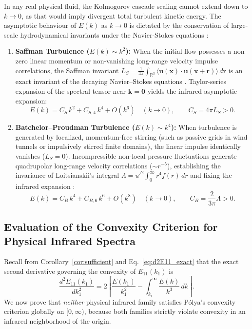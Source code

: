 \documentclass[lineno]{jfm}
\begin{document}
In any real physical fluid, the Kolmogorov cascade scaling cannot extend down to $k \to 0$, as that would imply divergent total turbulent kinetic energy. The asymptotic behaviour of $E(k)$ as $k \to 0$ is dictated by the conservation of large-scale hydrodynamical invariants under the Navier-Stokes equations \citep{BatchelorProudman1956, Saffman1967, Davidson2004}:
\begin{enumerate}
\item \textbf{Saffman Turbulence ($E(k) \sim k^2$):} When the initial flow possesses a non-zero linear momentum or non-vanishing long-range velocity impulse correlations, the Saffman invariant $L_S = \frac{1}{4\pi} \int_{\mathbb{R}^3} \langle \mathbf{u}(\mathbf{x}) \cdot \mathbf{u}(\mathbf{x}+\mathbf{r}) \rangle\,d\mathbf{r}$ is an exact invariant of the decaying Navier--Stokes equations \citep{Saffman1967, Davidson2004}. Taylor-series expansion of the spectral tensor near $\mathbf{k} = \mathbf{0}$ yields the infrared asymptotic expansion:
\begin{equation}
E(k) = C_S\,k^2 + C_{S,4}\,k^4 + O(k^6) \quad (k \to 0), \qquad C_S = 4\pi L_S > 0.
\label{eq:saffman_expansion}
\end{equation}
\item \textbf{Batchelor--Proudman Turbulence ($E(k) \sim k^4$):} When turbulence is generated by localized, momentum-free stirring (such as passive grids in wind tunnels or impulsively stirred finite domains), the linear impulse identically vanishes ($L_S = 0$). Incompressible non-local pressure fluctuations generate quadrupolar long-range velocity correlations ($\sim r^{-5}$), establishing the invariance of Loitsianskii's integral $\Lambda = u'^2 \int_0^\infty r^4 f(r)\,dr$ and fixing the infrared expansion \citep{BatchelorProudman1956, Davidson2004}:
\begin{equation}
E(k) = C_B\,k^4 + C_{B,6}\,k^6 + O(k^8) \quad (k \to 0), \qquad C_B = \frac{2}{3\pi} \Lambda > 0.
\label{eq:batchelor_expansion}
\end{equation}
\end{enumerate}

\subsection{Evaluation of the Convexity Criterion for Physical Infrared Spectra}

Recall from Corollary~\ref{cor:sufficient} and Eq.~\eqref{eq:d2E11_exact} that the exact second derivative governing the convexity of $E_{11}(k_1)$ is
\begin{equation}
\frac{d^2 E_{11}(k_1)}{d k_1^2} = 2 \left[ \frac{E(k_1)}{k_1^2} - \int_{k_1}^\infty \frac{E(k)}{k^3}\,dk \right].
\label{eq:convexity_diff}
\end{equation}
We now prove that \emph{neither} physical infrared family satisfies P\'olya's convexity criterion globally on $[0, \infty)$, because both families strictly violate convexity in an infrared neighborhood of the origin.
\end{document}
